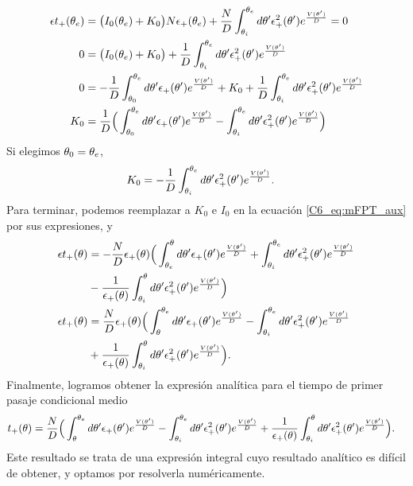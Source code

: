 \documentclass[./main.tex]{subfiles}
\begin{document}
\begin{align}
   \epsilon t_+(\theta_e) &= \big(I_0(\theta_e)+K_0\big) N \epsilon_{+}(\theta_e) + \frac{N}{D} \int_{\theta_i}^{\theta_e} d\theta'  \epsilon_{+}^2(\theta') e^{ \frac{V(\theta')}{D}} = 0 \nonumber \\
   0&=\big(I_0(\theta_e)+K_0\big) + \frac{1}{D} \int_{\theta_i}^{\theta_e} d\theta'  \epsilon_{+}^2(\theta') e^{ \frac{V(\theta')}{D}} \nonumber \\
   0&=-\frac{1}{D} \int_{\theta_0}^{\theta_e} d \theta' \epsilon_{+}(\theta') e^{ \frac{V(\theta')}{D}} +K_0 + \frac{1}{D} \int_{\theta_i}^{\theta_e} d\theta'  \epsilon_{+}^2(\theta') e^{ \frac{V(\theta')}{D}} \nonumber \\
   K_0 &= \frac{1}{D} \Big( \int_{\theta_0}^{\theta_e} d \theta' \epsilon_{+}(\theta') e^{ \frac{V(\theta')}{D}} - \int_{\theta_i}^{\theta_e} d\theta'  \epsilon_{+}^2(\theta') e^{ \frac{V(\theta')}{D}}\Big)
\end{align}
Si elegimos $\theta_0 = \theta_e$,
\begin{align}
   K_0 &= -\frac{1}{D} \int_{\theta_i}^{\theta_e} d\theta'  \epsilon_{+}^2(\theta') e^{ \frac{V(\theta')}{D}}.
\end{align}
Para terminar, podemos reemplazar a $K_0$ e $I_0$ en la ecuación \ref{C6_eq:mFPT_aux} por sus expresiones, y
\begin{align}
   \epsilon t_+(\theta) &= - \frac{N}{D} \epsilon_{+}(\theta) \Big(  \int_{\theta_e}^\theta d \theta' \epsilon_{+}(\theta') e^{ \frac{V(\theta')}{D}} +  \int_{\theta_i}^{\theta_e} d\theta'  \epsilon_{+}^2(\theta') e^{ \frac{V(\theta')}{D}} \nonumber \\ & - \frac{1}{\epsilon_{+}(\theta)} \int_{\theta_i}^{\theta} d\theta'  \epsilon_{+}^2(\theta') e^{ \frac{V(\theta')}{D}} \Big) \nonumber \\
     \epsilon t_+(\theta) &= \frac{N}{D} \epsilon_{+}(\theta) \Big(  \int_\theta^{\theta_e} d \theta' \epsilon_{+}(\theta') e^{ \frac{V(\theta')}{D}} -  \int_{\theta_i}^{\theta_e} d\theta'  \epsilon_{+}^2(\theta') e^{ \frac{V(\theta')}{D}} \nonumber \\ & + \frac{1}{\epsilon_{+}(\theta)} \int_{\theta_i}^{\theta} d\theta'  \epsilon_{+}^2(\theta') e^{ \frac{V(\theta')}{D}} \Big).
\end{align}
Finalmente, logramos obtener la expresión analítica para el tiempo de primer pasaje condicional medio
\begin{align}
     t_{+}(\theta)&= \frac{N}{D} \Big(  \int_\theta^{\theta_e} d \theta' \epsilon_{+}(\theta') e^{ \frac{V(\theta')}{D}} -  \int_{\theta_i}^{\theta_e} d\theta'  \epsilon_{+}^2(\theta') e^{ \frac{V(\theta')}{D}} + \frac{1}{\epsilon_{+}(\theta)} \int_{\theta_i}^{\theta} d\theta'  \epsilon_{+}^2(\theta') e^{ \frac{V(\theta')}{D}} \Big). \label{C6_eq:mFPT_tplus_res}
\end{align}
Este resultado se trata de una expresión integral cuyo resultado analítico es difícil de obtener, y optamos por resolverla numéricamente.
\end{document}
